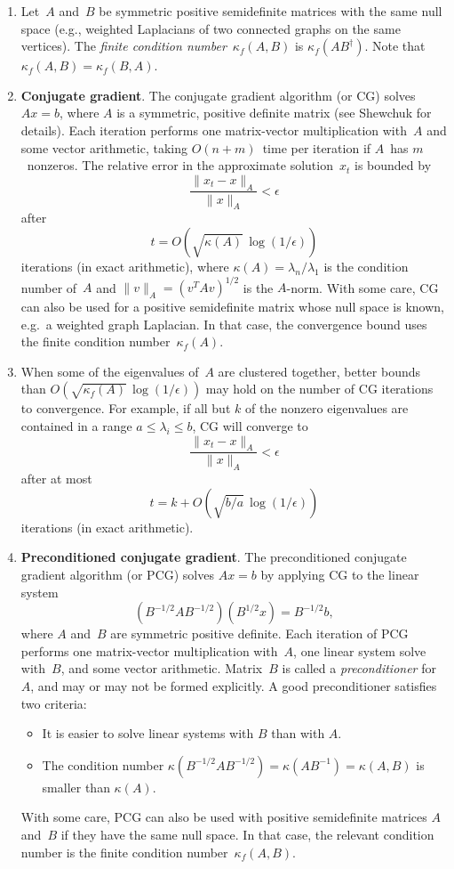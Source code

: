 \documentclass[11pt]{article}
\newcommand{\pinv}{^{\dagger}}          %
\begin{document}
\begin{enumerate}
\item
Let~$A$ and~$B$ be symmetric positive semidefinite matrices
with the same null space (e.g., weighted Laplacians of two
connected graphs on the same vertices).
The {\em finite condition number}~$\kappa_f(A,B)$ is $\kappa_f(AB\pinv)$.
Note that $\kappa_f(A,B) = \kappa_f(B,A)$.

\item{\bf Conjugate gradient}.\label{cg} 
The conjugate gradient algorithm (or CG)
solves $Ax=b$, where $A$ is a symmetric, positive definite
matrix (see Shewchuk for details).
Each iteration performs one matrix-vector multiplication with~$A$
and some vector arithmetic, taking $O(n+m)$~time per iteration
if $A$~has $m$~nonzeros.
The relative error in the approximate solution~$x_t$ is bounded by
$$\frac{\|x_t-x\|_A}{\|x\|_A} < \epsilon$$
after 
$$t = O(\sqrt{\kappa(A)}\,\log(1/\epsilon))$$
iterations (in exact arithmetic), 
where $\kappa(A)=\lambda_n/\lambda_1$ is the condition number of~$A$
and $\|v\|_A = (v^TAv)^{1/2}$ is the $A$-norm.
With some care, CG can also be used for a positive semidefinite
matrix whose null space is known, e.g.\ a weighted graph Laplacian.
In that case, 
the convergence bound uses the finite condition number~$\kappa_f(A)$.

\item\label{evalcluster}
When some of the eigenvalues of~$A$ are clustered together, 
better bounds than $O(\sqrt{\kappa_f(A)}\,\log(1/\epsilon))$
may hold on the number of CG iterations to convergence.
For example, if all but $k$ of the nonzero eigenvalues are
contained in a range $a\le\lambda_i\le b$, CG will converge to
$$\frac{\|x_t-x\|_A}{\|x\|_A} < \epsilon$$
after at most
$$t = k + O(\sqrt{b/a}\,\log(1/\epsilon))$$
iterations (in exact arithmetic).

\item{\bf Preconditioned conjugate gradient}.\label{pcg} 
The preconditioned conjugate gradient algorithm (or PCG)
solves $Ax=b$ by applying CG to the linear system 
$$(B^{-1/2}AB^{-1/2})(B^{1/2}x) = B^{-1/2}b,$$
where $A$ and~$B$ are symmetric positive definite.
Each iteration of PCG performs one matrix-vector multiplication with~$A$,
one linear system solve with~$B$, and some vector arithmetic.
Matrix~$B$ is called a {\em preconditioner} for~$A$, 
and may or may not be formed explicitly.
A good preconditioner satisfies two criteria:
\begin{itemize}
\item It is easier to solve linear systems with $B$ than with $A$.
\item The condition number 
$\kappa(B^{-1/2}AB^{-1/2}) = \kappa(AB^{-1}) = \kappa(A,B)$
is smaller than $\kappa(A)$.
\end{itemize}
With some care, PCG can also be used with positive semidefinite
matrices $A$ and~$B$ if they have the same null space.
In that case, 
the relevant condition number is the finite condition number~$\kappa_f(A,B)$.


\end{enumerate}
\end{document}
